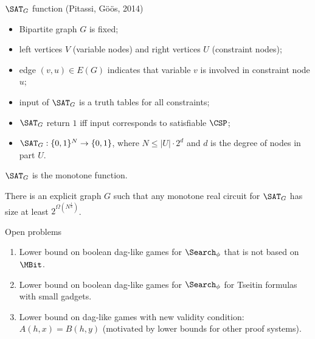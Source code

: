 \begin{frame}{$\SAT_{G}$ function (Pitassi, G{\"{o}}{\"{o}}s, 2014)}

    \begin{itemize}
        \pause
        \item Bipartite graph $G$ is fixed;
        \pause
        \item left vertices $V$ (variable nodes) and right vertices $U$ (constraint nodes);
        \pause
        \item edge $(v, u) \in E(G)$ indicates that variable $v$ is involved in constraint node $u$;
        \pause
        \item input of $\SAT_{G}$ is a truth tables for all constraints;
        \pause
        \item $\SAT_{G}$ return $1$ iff input corresponds to satisfiable $\CSP$;
        \pause
        \item $\SAT_{G}: \{0, 1\}^N \to \{0, 1\}$, where $N \le |U| \cdot 2^d$ and $d$ is the
            degree of nodes in part $U$.
    \end{itemize}

    $\SAT_{G}$ is the monotone function.

    \pause
    \begin{theorem}[S 2016]
        There is an explicit graph $G$ such that any monotone real circuit for $\SAT_{G}$ has size at
        least $2^{\Omega(N^{\frac{1}{8}})}$.
    \end{theorem}
\end{frame}

\begin{frame}{Open problems}
    \begin{enumerate}
        \pause
        \item Lower bound on boolean dag-like games for $\Search_{\phi}$ that is not based on $\MBit$.
        \pause
        \item Lower bound on boolean dag-like games for $\Search_{\phi}$ for Tseitin formulas with small
            gadgets.
        \pause
        \item Lower bound on dag-like games with new validity condition: $A(h, x) = B(h, y)$ (motivated
            by lower bounds for other proof systems).
    \end{enumerate}
\end{frame}